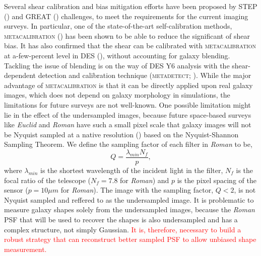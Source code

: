 \documentclass[fleqn,usenatbib]{mnras}
\begin{document}
Several shear calibration and bias mitigation efforts have been proposed by STEP (\citealt{2006MNRAS.368.1323H, 2007MNRAS.376...13M}) and GREAT (\citealt{2010MNRAS.405.2044B, 2013ApJS..205...12K, 2015MNRAS.450.2963M}) challenges, to meet the requirements for the current imaging surveys. In particular, one of the state-of-the-art self-calibration methods, \textsc{metacalibration} (\citealt{2017arXiv170202600H, 2017ApJ...841...24S}) has been shown to be able to reduce the significant of shear bias. It has also confirmed that the shear can be calibrated with \textsc{metacalibration} at a-few-percent level in DES (\citealt{2018MNRAS.481.1149Z, 2020arXiv201103408G}), without accounting for galaxy blending. Tackling the issue of blending is on the way of DES Y6 analysis with the shear-dependent detection and calibration technique (\textsc{metadetect}; \citealt{2020ApJ...902..138S}). While the major advantage of \textsc{metacalibration} is that it can be directly applied upon real galaxy images, which does not depend on galaxy morphology in simulations, the limitations for future surveys are not well-known. One possible limitation might lie in the effect of the undersampled images, because future space-based surveys like \emph{Euclid} and \emph{Roman} have such a small pixel scale that galaxy images will not be Nyquist sampled at a native resolution (\citealt{2013PASP..125.1496S}) based on the Nyquist-Shannon Sampling Theorem. We define the sampling factor of each filter in \emph{Roman} to be, 
\begin{equation}
    Q = \frac{\lambda_{min}N_{f}}{p}, 
    \label{eqn:sampling}
\end{equation}
where $\lambda_{min}$ is the shortest wavelength of the incident light in the filter, $N_{f}$ is the focal ratio of the telescope ($N_{f}=7.8$ for \emph{Roman}) and $p$ is the pixel spacing of the sensor ($p=10\mu m$ for \emph{Roman}). The image with the sampling factor, $Q < 2$, is not Nyquist sampled and reffered to as the undersampled image. It is problematic to measure galaxy shapes solely from the undersampled images, because the \emph{Roman} PSF that will be used to recover the shapes is also undersampled and has a complex structure, not simply Gaussian. \textcolor{red}{It is, therefore, necessary to build a robust strategy that can reconstruct better sampled PSF to allow unbiased shape measurement. }
\end{document}
